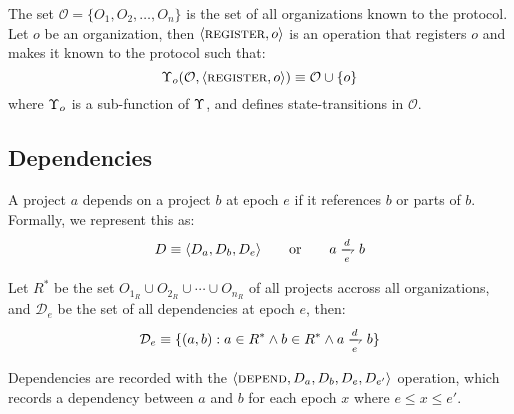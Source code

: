The set $\mathcal{O} = \{O_1, O_2, \dotsc, O_n\}$ is the set of all organizations
known to the protocol.  Let $o$ be an organization, then $\langle \text{\normalfont\scshape register}, o \rangle$ is
an operation that registers $o$ and makes it known to the protocol such that:
\[
    \Upsilon_o(\mathcal{O}, \langle \text{\normalfont\scshape register}, o \rangle)
    \equiv \mathcal{O} \cup \{o\}
\]
where $\Upsilon_o$ is a sub-function of $\Upsilon$, and defines
state-transitions in $\mathcal{O}$.

\subsection{Dependencies}
\label{dependencies}

A project $a$ depends on a project $b$ at epoch $e$ if it references $b$
or parts of $b$. Formally, we represent this as:
\[
    D \equiv \tuple{D_a, D_b, D_e} \qquad \text{or} \qquad a \dep b
\]


Let $R^*$ be the set $O_{1_R} \cup O_{2_R} \cup \cdots \cup
O_{n_R}$ of all projects accross all organizations, and $\mathcal{D}_e$ be the
set of all dependencies at epoch $e$, then:
\[
    \mathcal{D}_e \equiv \{(a, b) : a \in R^*
    \land b \in R^*
    \land a \dep b \}
\]

Dependencies are recorded with the $\langle \text{\normalfont\scshape depend}, D_a, D_b, D_e, D_{e'} \rangle$
operation, which records a dependency between $a$ and $b$ for each epoch $x$
where $e \leqslant x \leqslant e'$.
